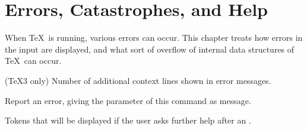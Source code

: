 
\chapter{Errors, Catastrophes,  and Help}\label{error}

When \TeX\ is running, various errors can occur.
This chapter treats how errors in the input are displayed,
and what sort of overflow of internal data structures
of \TeX\ can occur.

\label{cschap:errorcontextlines}\label{cschap:errmessage}\label{cschap:errhelp}
\begin{inventory}
\item [\cs{errorcontextlines}] 
      (\TeX3 only)
      Number of additional context lines shown in error messages.

\item [\cs{errmessage}] 
      Report an error, giving the parameter of this command as message.

\item [\cs{errhelp}] 
      Tokens that will be displayed if the user 
      asks further help after an .

\end{inventory}

